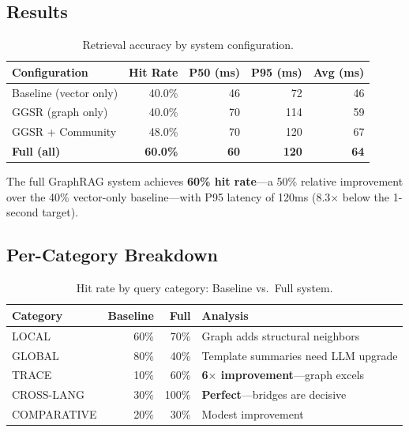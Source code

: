 \documentclass[11pt,letterpaper]{article}
\begin{document}
\subsection{Results}

\begin{table}[H]
\centering
\caption{Retrieval accuracy by system configuration.}
\label{tab:results}
\begin{tabular}{@{}lrrrr@{}}
\toprule
\textbf{Configuration} & \textbf{Hit Rate} & \textbf{P50 (ms)} &
    \textbf{P95 (ms)} & \textbf{Avg (ms)} \\
\midrule
Baseline (vector only)   & 40.0\% & 46  & 72  & 46 \\
GGSR (graph only)        & 40.0\% & 70  & 114 & 59 \\
GGSR + Community         & 48.0\% & 70  & 120 & 67 \\
\textbf{Full (all)}      & \textbf{60.0\%} & \textbf{60} & \textbf{120} & \textbf{64} \\
\bottomrule
\end{tabular}
\end{table}

\begin{keyresult}
The full GraphRAG system achieves \textbf{60\% hit rate}---a 50\%
relative improvement over the 40\% vector-only baseline---with P95
latency of 120ms (8.3$\times$ below the 1-second target).
\end{keyresult}

\subsection{Per-Category Breakdown}

\begin{table}[H]
\centering
\caption{Hit rate by query category: Baseline vs.\ Full system.}
\label{tab:percategory}
\begin{tabular}{@{}lrrl@{}}
\toprule
\textbf{Category} & \textbf{Baseline} & \textbf{Full} & \textbf{Analysis} \\
\midrule
LOCAL        & 60\% & 70\% & Graph adds structural neighbors \\
GLOBAL       & 80\% & 40\% & Template summaries need LLM upgrade \\
TRACE        & 10\% & 60\% & \textbf{6$\times$ improvement}---graph excels \\
CROSS-LANG   & 30\% & 100\% & \textbf{Perfect}---bridges are decisive \\
COMPARATIVE  & 20\% & 30\% & Modest improvement \\
\bottomrule
\end{tabular}
\end{table}
\end{document}
